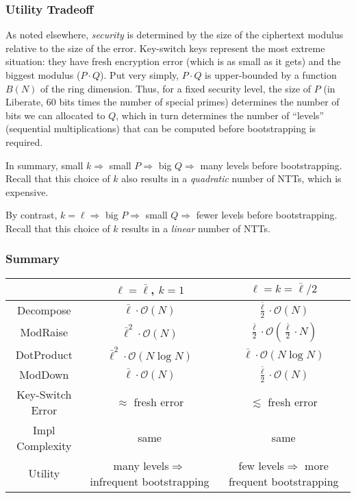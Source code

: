 \documentclass[../keyswitching.tex]{subfiles}
\begin{document}
\subsubsection{Utility Tradeoff}
As noted elsewhere, \emph{security} is determined by the size of the ciphertext modulus relative to the size of the error. Key-switch keys represent the most extreme situation: they have fresh encryption error (which is as small as it gets) and the biggest modulus ($P\cdot Q$). Put very simply, $P\cdot Q$ is upper-bounded by a function $B(N)$ of the ring dimension. Thus, for a fixed security level, the size of $P$ (in Liberate, 60 bits times the number of special primes) determines the number of bits we can allocated to $Q$, which in turn determines the number of ``levels'' (sequential multiplications) that can be computed before bootstrapping is required.

In summary, small $k \Rightarrow$ small $P \Rightarrow$ big $Q\Rightarrow$ many levels before bootstrapping. Recall that this choice of $k$ also results in a \emph{quadratic} number of NTTs, which is expensive.

By contrast, $k=\ell \Rightarrow$ big $P \Rightarrow$ small $Q\Rightarrow$ fewer levels before bootstrapping. Recall that this choice of $k$ results in a \emph{linear} number of NTTs.

\subsubsection{Summary}
{
	\renewcommand{\arraystretch}{1.5}
	\begin{center}
		\begin{tabular}{ |c|c|c| } 
			\hline
			& $\ell=\bar{\ell}$, $k = 1$ & $\ell = k = \bar{\ell}/2$ \\
			\hline
			Decompose  & $\bar{\ell}\cdot \mathcal{O}(N)$         & $\frac{\bar{\ell}}{2}\cdot\mathcal{O}(N)$                      \\
			ModRaise   & $\bar{\ell}^2\cdot \mathcal{O}(N)$       & $\frac{\bar{\ell}}{2}\cdot \mathcal{O}(\frac{\bar{\ell}}{2}\cdot N)$ \\
			DotProduct & $\bar{\ell}^2\cdot \mathcal{O}(N\log N)$ & $\bar{\ell}\cdot \mathcal{O}(N\log N)$                         \\
			ModDown    & $\bar{\ell}\cdot\mathcal{O}(N)$          & $\frac{\bar{\ell}}{2}\cdot\mathcal{O}(N)$                      \\
			Key-Switch Error & $\approx$ fresh error & $\lesssim$ fresh error \\
			Impl Complexity & same & same \\
			Utility & \makecell[c]{many levels$\Rightarrow$\\ infrequent bootstrapping} & \makecell[c]{few levels$\Rightarrow$\\more frequent bootstrapping} \\
			\hline
		\end{tabular}
	\end{center}
}
\end{document}
